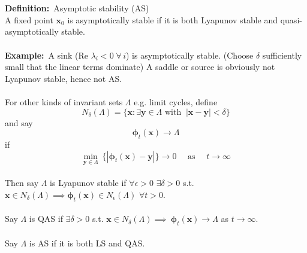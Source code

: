 \documentclass{article}
\newcommand{\example}{\textbf{Example:}}                    %
\newcommand{\definition}{\textbf{Definition:}}              %
\newcommand{\bp}{\bm{\phi}}                                 %
\begin{document}
\\
\\
\definition\ Asymptotic stability (AS)
\\
A fixed point $\bm{x}_0$ is asymptotically stable if it is both Lyapunov stable
and quasi-asymptotically stable.
\\
\\
\example\ A sink (Re $\lambda_i <0 \; \forall \, i$) is asymptotically
stable. (Choose $\delta$ sufficiently small that the linear terms dominate)
A saddle or source is obviously not Lyapunov stable, hence not AS.
\\
\\
For other kinds of invariant sets $\Lambda$ e.g. limit cycles, define
\[ N_{\delta}(\Lambda) = \{ \bm{x} : \exists \bm{y} \in \Lambda \mbox{ with } \
|\bm{x} - \bm{y}| < \delta \} \]
and say 
\[ \bp_t(\bm{x}) \to \Lambda\]
if
\[\min_{\bm{y} \in \Lambda} \
\{ | \bp_t(\bm{x}) - \bm{y}| \} \to 0 \quad \mbox{ as } \quad t \to \infty \]
\\
Then say $\Lambda$ is Lyapunov stable if $\forall \epsilon > 0$ $\exists \delta>0$ s.t.
$\bm{x} \in N_{\delta}(\Lambda) \implies \bp_t(\bm{x}) \in N_{\epsilon}(\Lambda)$
$\forall t >0$.
\\
\\
Say $\Lambda$ is QAS if $\exists \delta >0$ s.t. $\bm{x} \in N_{\delta}(\Lambda) \implies \
\bp_t(\bm{x}) \to \Lambda$ as $t \to \infty$.
\\
\\
Say $\Lambda$ is AS if it is both LS and QAS.
\\
\end{document}
